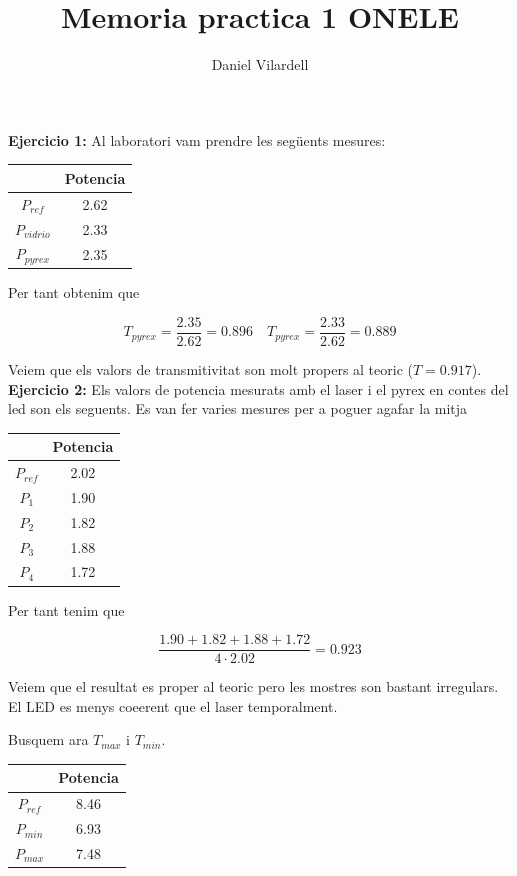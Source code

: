 \documentclass[12pt, a4papre]{article}
\author{Daniel Vilardell}
\title{Memoria practica 1 ONELE}
\date{}
\begin{document}
	\maketitle
	\textbf{Ejercicio 1:} Al laboratori vam prendre les següents mesures:
	
	\begin{center}
		\begin{tabular}{ ||c|c|| } 
			\hline
			& Potencia\\ 
			\hline
			$P_{ref}$ & 2.62\\ 
			$P_{vidrio}$ & 2.33\\ 
			$P_{pyrex}$ & 2.35\\ 
			\hline
		\end{tabular}
	\end{center}
	
	Per tant obtenim que 
	
	\[
		T_{pyrex} = \frac{2.35}{2.62} = 0.896 \quad T_{pyrex} = \frac{2.33}{2.62} = 0.889
	\]
	
	Veiem que els valors de transmitivitat son molt propers al teoric  ($T = 0.917$).\\
	
	\textbf{Ejercicio 2:} Els valors de potencia mesurats amb el laser i el pyrex en contes del led son els seguents. Es van fer varies mesures per a poguer agafar la mitja
	
	\begin{center}
		\begin{tabular}{ ||c|c|| } 
			\hline
			& Potencia\\ 
			\hline
			$P_{ref}$ & 2.02\\ 
			$P_1$ & 1.90\\ 
			$P_2$ & 1.82\\ 
			$P_3$ & 1.88\\ 
			$P_4$ & 1.72\\ 
			\hline
		\end{tabular}
	\end{center}
	
	Per tant tenim que 
	
	\[
		\frac{1.90+1.82+1.88+1.72}{4\cdot 2.02} = 0.923
	\]
	
	Veiem que el resultat es proper al teoric pero les mostres son bastant irregulars. El LED es menys coeerent que el laser temporalment.
	
	Busquem ara $T_{max}$ i $T_{min}$.
	
	\begin{center}
		\begin{tabular}{ ||c|c|| } 
			\hline
			& Potencia\\ 
			\hline
			$P_{ref}$ & 8.46\\ 
			$P_{min}$ & 6.93\\ 
			$P_{max}$ & 7.48\\ 
			\hline
		\end{tabular}
	\end{center}
	
\end{document}
